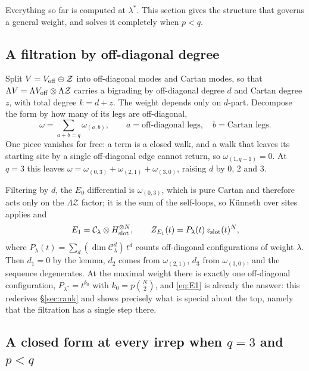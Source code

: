 \documentclass[10pt]{article}
\begin{document}
Everything so far is computed at $\lambda^*$. This section gives the structure that governs a general weight,
and solves it completely when $p<q$.

\subsection{A filtration by off-diagonal degree}

Split $V=V_{\rm off}\oplus\mathcal Z$ into off-diagonal modes and Cartan modes, so that
$\Lambda V=\Lambda V_{\rm off}\otimes\Lambda\mathcal Z$ carries a bigrading by off-diagonal degree $d$ and Cartan
degree $z$, with total degree $k=d+z$. The weight depends only on $d$-part. Decompose the form by how many of
its legs are off-diagonal,
\begin{equation}
\omega=\sum_{a+b=q}\omega_{(a,b)},\qquad a=\text{off-diagonal legs},\quad b=\text{Cartan legs}.
\end{equation}
One piece vanishes for free: a term is a closed walk, and a walk that leaves its starting site by a single
off-diagonal edge cannot return, so $\omega_{(1,q-1)}=0$. At $q=3$ this leaves
$\omega=\omega_{(0,3)}+\omega_{(2,1)}+\omega_{(3,0)}$, raising $d$ by $0$, $2$ and $3$.

Filtering by $d$, the $E_0$ differential is $\omega_{(0,3)}$, which is pure Cartan and therefore acts only on the
$\Lambda\mathcal Z$ factor; it is the sum of the self-loops, so K\"unneth over sites applies and
\begin{equation}
E_1=\mathcal C_\lambda\otimes H_{\rm slot}^{\otimes N},\qquad
Z_{E_1}(t)=P_\lambda(t)\,z_{\rm slot}(t)^{N},
\label{eq:E1}
\end{equation}
where $P_\lambda(t)=\sum_d(\dim\mathcal C^d_\lambda)\,t^d$ counts off-diagonal configurations of weight $\lambda$.
Then $d_1=0$ by the lemma, $d_2$ comes from $\omega_{(2,1)}$, $d_3$ from $\omega_{(3,0)}$, and the sequence
degenerates. At the maximal weight there is exactly one off-diagonal configuration, $P_{\lambda^*}=t^{k_0}$ with
$k_0=p\binom N2$, and \eqref{eq:E1} is already the answer: this rederives \S\ref{sec:rank} and shows precisely
what is special about the top, namely that the filtration has a single step there.

\subsection{A closed form at every irrep when $q=3$ and $p<q$}
\end{document}
